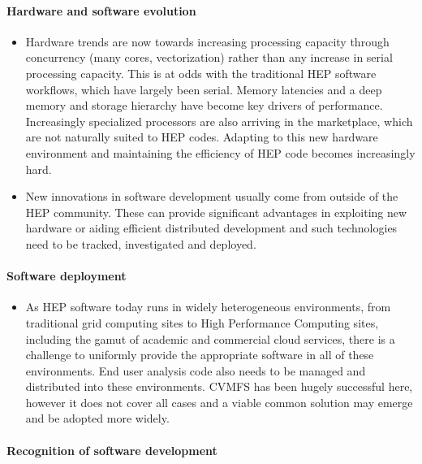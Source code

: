 \documentclass[12pt,a4paper]{article}
\begin{document}
\paragraph{Hardware and software evolution}

\begin{itemize}
\item
    Hardware trends are now towards increasing processing capacity through
  concurrency (many cores, vectorization) rather than any increase in
  serial processing capacity. This is at odds with the traditional HEP
  software workflows, which have largely been serial. Memory latencies
  and a deep memory and storage hierarchy have become key drivers of
  performance. Increasingly specialized processors are also arriving in
  the marketplace, which are not naturally suited to HEP codes. Adapting
  to this new hardware environment and maintaining the efficiency of HEP
  code becomes increasingly hard.
  \item
    New innovations in software development usually come from outside of
  the HEP community. These can provide significant advantages in
  exploiting new hardware or aiding efficient distributed development
  and such technologies need to be tracked, investigated and deployed.
\end{itemize}

\paragraph{Software deployment}

\begin{itemize}
\item
    As HEP software today runs in widely heterogeneous environments, from
  traditional grid computing sites to High Performance Computing sites,
  including the gamut of academic and commercial cloud services, there
  is a challenge to uniformly provide the appropriate software in all of
  these environments. End user analysis code also needs to be managed
  and distributed into these environments. CVMFS\cite{7310920} has been hugely
  successful here, however it does not cover all cases and a viable
  common solution may emerge and be adopted more widely.
\end{itemize}

\paragraph{Recognition of software development}
\end{document}
